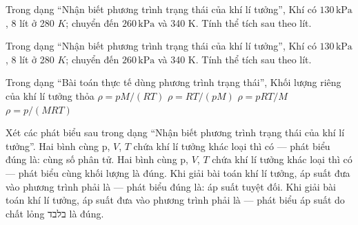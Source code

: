 \begin{bt}
Trong dạng “Nhận biết phương trình trạng thái của khí lí tưởng”, Khí có $130\,\text{kPa}$, 8 lít ở 280 $K$; chuyển đến $260\,\text{kPa}$ và 340 K. Tính thể tích sau theo lít.
\end{bt}

\begin{ex}
Trong dạng “Nhận biết phương trình trạng thái của khí lí tưởng”, Khí có $130\,\text{kPa}$, 8 lít ở 280 $K$; chuyển đến $260\,\text{kPa}$ và 340 K. Tính thể tích sau theo lít.
\end{ex}

\begin{ex}
Trong dạng “Bài toán thực tế dùng phương trình trạng thái”, Khối lượng riêng của khí lí tưởng thỏa
\choice
{\True $\rho=pM/(RT)$}
{$\rho=RT/(pM)$}
{$\rho=pRT/M$}
{$\rho=p/(MRT)$}
\end{ex}

\begin{ex}
Xét các phát biểu sau trong dạng “Nhận biết phương trình trạng thái của khí lí tưởng”.
\choiceTF
{\True Hai bình cùng p, $V$, $T$ chứa khí lí tưởng khác loại thì có — phát biểu đúng là: cùng số phân tử.}
{Hai bình cùng p, $V$, $T$ chứa khí lí tưởng khác loại thì có — phát biểu cùng khối lượng là đúng.}
{\True Khi giải bài toán khí lí tưởng, áp suất đưa vào phương trình phải là — phát biểu đúng là: áp suất tuyệt đối.}
{Khi giải bài toán khí lí tưởng, áp suất đưa vào phương trình phải là — phát biểu áp suất do chất lỏng בלבד là đúng.}
\end{ex}

